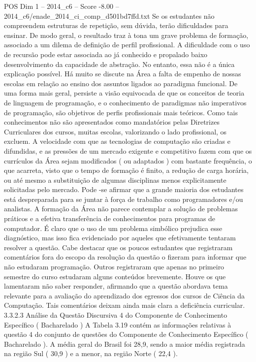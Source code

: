 \begin{textsample}{POS Dim 1 – 2014\_c6 – Score -8.00 – 2014\_c6/enade\_2014\_ci\_comp\_d501bd7ffd.txt}
Se os estudantes não compreendem estruturas de repetição, sem dúvida, terão dificuldades para ensinar.
De modo geral, o resultado traz à tona um grave problema de formação, associado a um dilema de definição de perfil profissional.
A dificuldade com o uso de recursão pode estar associada ao já conhecido e propalado baixo desenvolvimento da capacidade de abstração.
No entanto, essa não é a única explicação possível.
Há muito se discute na Área a falta de empenho de nossas escolas em relação ao ensino dos assuntos ligados ao paradigma funcional.
De uma forma mais geral, persiste a visão equivocada de que os conceitos de teoria de linguagem de programação, e o conhecimento de paradigmas não imperativos de programação, são objetivos de perfis profissionais mais teóricos.
Como tais conhecimentos não são apresentados como mandatórios pelas Diretrizes Curriculares dos cursos, muitas escolas, valorizando o lado profissional, os excluem.
A velocidade com que as tecnologias de computação são criadas e difundidas, e as pressões de um mercado exigente e competitivo fazem com que os currículos da Área sejam modificados ( ou adaptados ) com bastante frequência, o que acarreta, visto que o tempo de formação é finito, a redução de carga horária, ou até mesmo a substituição de algumas disciplinas menos explicitamente solicitadas pelo mercado.
Pode -se afirmar que a grande maioria dos estudantes está despreparada para se juntar à força de trabalho como programadores e/ou analistas.
A formação da Área não parece contemplar a solução de problemas práticos e a efetiva transferência de conhecimentos para programas de computador.
É claro que o uso de um problema simbólico prejudica esse diagnóstico, mas isso fica evidenciado por aqueles que efetivamente tentaram resolver a questão.
Cabe destacar que os poucos estudantes que registraram comentários fora do escopo da resolução da questão o fizeram para informar que não estudaram programação.
Outros registraram que apenas no primeiro semestre do curso estudaram alguns conteúdos brevemente.
Houve os que lamentaram não saber responder, afirmando que a questão abordava tema relevante para a avaliação do aprendizado dos egressos dos cursos de Ciência da Computação.
Tais comentários deixam ainda mais clara a deficiência curricular. 3.3.2.3 Análise da Questão Discursiva 4 do Componente de Conhecimento Específico ( Bacharelado ) A Tabela 3.19 contém as informações relativas à questão 4 do conjunto de questões do Componente de Conhecimento Específico ( Bacharelado ).
A média geral do Brasil foi 28,9, sendo a maior média registrada na região Sul ( 30,9 ) e a menor, na região Norte ( 22,4 ).

\end{textsample}
